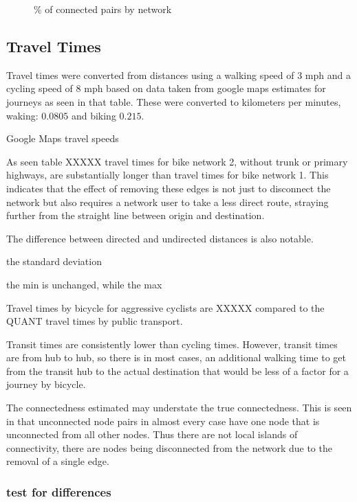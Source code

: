 \begin{figure}
\centering
\caption{\% of connected pairs by network}
\label{fig:connected_pairs}
\end{figure}

\subsection{Travel Times}

Travel times were converted from distances using a walking speed of 3 mph and a cycling speed of 8 mph based on data taken from google maps estimates for journeys as seen in that table. These were converted to kilometers per minutes, waking: $0.0805$ and biking $0.215$. 

\begin{table}
\centering
\caption{Google Maps travel speeds}
\label{table:travel_speeds}
\end{table}

As seen table XXXXX travel times for bike network 2, without trunk or primary highways, are substantially longer than travel times for bike network 1. This indicates that the effect of removing these edges is not just to disconnect the network but also requires a network user to take a less direct route, straying further from the straight line between origin and destination. 

The difference between directed and undirected distances is also notable. 

the standard deviation 

the min is unchanged, while the max 

Travel times by bicycle for aggressive cyclists are XXXXX compared to the QUANT travel times by public transport. 


Transit times are consistently lower than cycling times. However, transit times are from hub to hub, so there is in most cases, an additional walking time to get from the transit hub to the actual destination that would be less of a factor for a journey by bicycle. 


The connectedness estimated may understate the true connectedness. This is seen in that unconnected node pairs in almost every case have one node that is unconnected from all other nodes. Thus there are not local islands of connectivity, there are nodes being disconnected from the network due to the removal of a single edge. 


\subsubsection{test for differences}


